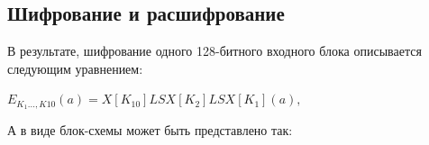 \documentclass[a4paper,14pt]{report}
\begin{document}
\begin{figure}[h]
\label{fig:image}
\end{figure}



\subsection{Шифрование и расшифрование}

В результате, шифрование одного 128-битного входного блока описывается следующим уравнением:

$E_{K_{1}...,K{10}}(a) = X[K_{10}]LSX[K_{2}]LSX[K_{1}](a),$

А в виде блок-схемы может быть представлено так:
\end{document}
